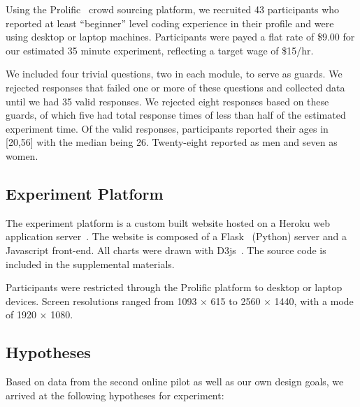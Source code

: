     Using the Prolific~\cite{prolific} crowd sourcing platform, we recruited 43 participants who reported at least ``beginner'' level coding experience in their profile and were using desktop or laptop machines. Participants were payed a flat rate of \$9.00 for our estimated 35 minute experiment, reflecting a target wage of \$15/hr.
    
    We included four trivial questions, two in each module, to serve as guards. We rejected responses that failed one or more of these questions and collected data until we had 35 valid responses. We rejected eight responses based on these guards, of which five had total response times of less than half of the estimated experiment time. Of the valid responses, participants reported their ages in [20,56] with the median being 26. Twenty-eight reported as men and seven as women. 


\subsection{Experiment Platform}
    The experiment platform is a custom built website hosted on a Heroku web application server~\cite{experiment_platform}. The website is composed of a Flask~\cite{flask} (Python) server and a Javascript front-end. All charts were drawn with D3js~\cite{d3js}. The source code is included in the supplemental materials.
    
    Participants were restricted through the Prolific platform to desktop or laptop devices. Screen resolutions ranged from 1093 $\times$ 615 to 2560 $\times$ 1440, with a mode of 1920 $\times$ 1080.
    
    
\subsection{Hypotheses}

  Based on data from the second online pilot as well as our own design goals, we arrived at the following hypotheses for experiment:
    
